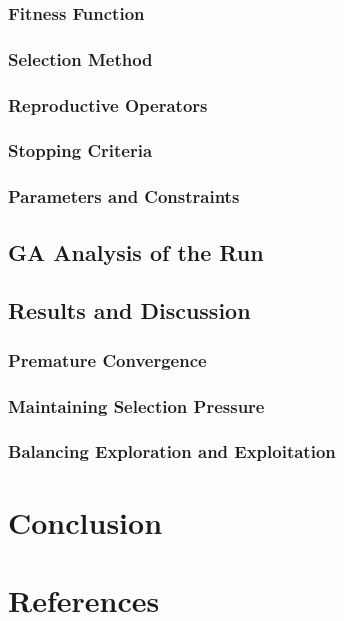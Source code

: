 \documentclass[conference]{inc/IEEEtran}
\begin{document}
\subsubsection{Fitness Function}

\subsubsection{Selection Method}

\subsubsection{Reproductive Operators}

\subsubsection{Stopping Criteria}

\subsubsection{Parameters and Constraints}
\subsection{GA Analysis of the Run}


\subsection{Results and Discussion}

\subsubsection{Premature Convergence}

\subsubsection{Maintaining Selection Pressure}

\subsubsection{Balancing Exploration and Exploitation}

\section{Conclusion}

\section*{References}




\end{document}
